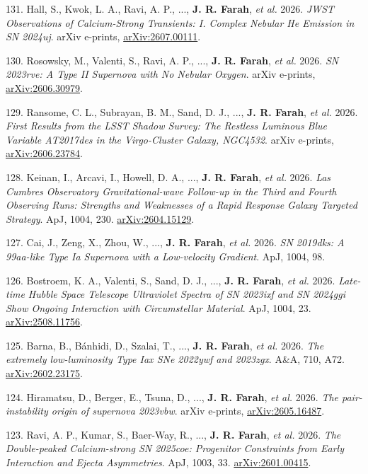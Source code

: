 \documentclass[margin,line]{res}
\newcommand{\apj}{ApJ}                    %
\newcommand{\aap}{A\&A}                   %
\begin{document}
\begin{resume}
131. Hall, S., Kwok, L. A., Ravi, A. P., ..., \textbf{J. R. Farah}, \textit{et al.} 2026. \textit{JWST Observations of Calcium-Strong Transients: I. Complex Nebular He Emission in SN 2024uj}. arXiv e-prints, \href{https://arxiv.org/abs/2607.00111}{arXiv:2607.00111}.

130. Rosowsky, M., Valenti, S., Ravi, A. P., ..., \textbf{J. R. Farah}, \textit{et al.} 2026. \textit{SN 2023rve: A Type II Supernova with No Nebular Oxygen}. arXiv e-prints, \href{https://arxiv.org/abs/2606.30979}{arXiv:2606.30979}.

129. Ransome, C. L., Subrayan, B. M., Sand, D. J., ..., \textbf{J. R. Farah}, \textit{et al.} 2026. \textit{First Results from the LSST Shadow Survey: The Restless Luminous Blue Variable AT2017des in the Virgo-Cluster Galaxy, NGC4532}. arXiv e-prints, \href{https://arxiv.org/abs/2606.23784}{arXiv:2606.23784}.

128. Keinan, I., Arcavi, I., Howell, D. A., ..., \textbf{J. R. Farah}, \textit{et al.} 2026. \textit{Las Cumbres Observatory Gravitational-wave Follow-up in the Third and Fourth Observing Runs: Strengths and Weaknesses of a Rapid Response Galaxy Targeted Strategy}. \apj, 1004, 230. \href{https://arxiv.org/abs/2604.15129}{arXiv:2604.15129}.

127. Cai, J., Zeng, X., Zhou, W., ..., \textbf{J. R. Farah}, \textit{et al.} 2026. \textit{SN 2019dks: A 99aa-like Type Ia Supernova with a Low-velocity Gradient}. \apj, 1004, 98.

126. Bostroem, K. A., Valenti, S., Sand, D. J., ..., \textbf{J. R. Farah}, \textit{et al.} 2026. \textit{Late-time Hubble Space Telescope Ultraviolet Spectra of SN 2023ixf and SN 2024ggi Show Ongoing Interaction with Circumstellar Material}. \apj, 1004, 23. \href{https://arxiv.org/abs/2508.11756}{arXiv:2508.11756}.

125. Barna, B., B{\'a}nhidi, D., Szalai, T., ..., \textbf{J. R. Farah}, \textit{et al.} 2026. \textit{The extremely low-luminosity Type Iax SNe 2022ywf and 2023zgx}. \aap, 710, A72. \href{https://arxiv.org/abs/2602.23175}{arXiv:2602.23175}.

124. Hiramatsu, D., Berger, E., Tsuna, D., ..., \textbf{J. R. Farah}, \textit{et al.} 2026. \textit{The pair-instability origin of supernova 2023vbw}. arXiv e-prints, \href{https://arxiv.org/abs/2605.16487}{arXiv:2605.16487}.

123. Ravi, A. P., Kumar, S., Baer-Way, R., ..., \textbf{J. R. Farah}, \textit{et al.} 2026. \textit{The Double-peaked Calcium-strong SN 2025coe: Progenitor Constraints from Early Interaction and Ejecta Asymmetries}. \apj, 1003, 33. \href{https://arxiv.org/abs/2601.00415}{arXiv:2601.00415}.


\end{resume}
\end{document}
